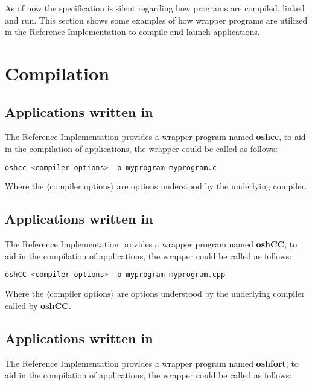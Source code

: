 
As of now the \openshmem{} specification is silent regarding how \openshmem{} programs are compiled, linked and run. This section shows some examples of
how wrapper programs are utilized in the \openshmem{} Reference Implementation to compile and launch applications.
\section{Compilation}
\subsection*{Applications written in \Clang}

The \openshmem{} Reference Implementation provides a wrapper program named \textbf{oshcc}, to aid in the compilation of \Clang{} applications, the wrapper
could be called as follows:

\begin{lstlisting}[language=bash]
oshcc <compiler options> -o myprogram myprogram.c
\end{lstlisting}
Where the $\langle\mbox{compiler options}\rangle$ are options understood by the underlying \Clang{} compiler.


\subsection*{Applications written in \Cpp}

The  \openshmem{} Reference Implementation provides a wrapper program named \textbf{oshCC}, to aid in the compilation of \Cpp{} applications, the
wrapper could be called as follows:

\begin{lstlisting}[language=bash]
oshCC <compiler options> -o myprogram myprogram.cpp
\end{lstlisting}
Where the $\langle\mbox{compiler options}\rangle$ are options understood by the underlying \Cpp{} compiler called by \textbf{oshCC}.


\subsection*{Applications written in \Fortran}

The  \openshmem{} Reference Implementation provides a wrapper program named \textbf{oshfort}, to aid in the compilation of \Fortran{} applications,
the wrapper could be called as follows:

